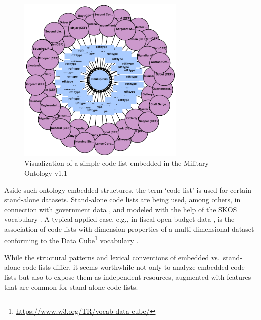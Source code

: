 \begin{figure}[ht]
\centering
\includegraphics[width=8cm]{figures/code-list-visualized}
\caption{Visualization of a simple code list embedded in the Military Ontology v1.1 \cite{military_ontology}}
\label{fig:code-list-visualized}
\end{figure}

Aside such ontology-embedded structures, 
the term `code list' is used for certain stand-alone datasets. %
Stand-alone code lists are being used, among others, in connection with government data %
\cite{guide_code_list}, and modeled with the help of
the SKOS vocabulary \cite{miles2009skos}. 
A typical applied case, e.g., in fiscal open budget data \cite{DBLP:conf/smap/FilippidisKKIB16}, is the association of code lists with dimension properties of a multi-dimensional dataset conforming to the Data Cube\footnote{\url{https://www.w3.org/TR/vocab-data-cube/}} vocabulary \cite{obeu_dcv}.

While the structural patterns and lexical conventions of embedded vs.~stand-alone code lists differ, it seems worthwhile not only to analyze embedded code lists but also to expose them as independent resources, augmented with features that are common for stand-alone code lists. 

